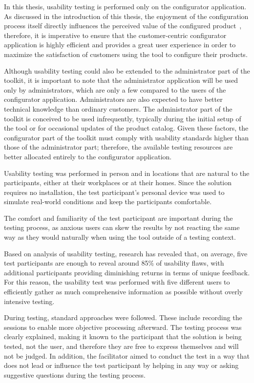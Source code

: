 In this thesis, usability testing is performed only on the configurator application. As discussed in the introduction of this thesis, the enjoyment of the configuration process itself directly influences the perceived value of the configured product~\cite{Franke2010}, therefore, it is imperative to ensure that the customer-centric configurator application is highly efficient and provides a great user experience in order to maximize the satisfaction of customers using the tool to configure their products.

Although usability testing could also be extended to the administrator part of the toolkit, it is important to note that the administrator application will be used only by administrators, which are only a few compared to the users of the configurator application. Administrators are also expected to have better technical knowledge than ordinary customers. The administrator part of the toolkit is conceived to be used infrequently, typically during the initial setup of the tool or for occasional updates of the product catalog. Given these factors, the configurator part of the toolkit must comply with usability standards higher than those of the administrator part; therefore, the available testing resources are better allocated entirely to the configurator application.

Usability testing was performed in person and in locations that are natural to the participants, either at their workplaces or at their homes. Since the solution requires no installation, the test participant's personal device was used to simulate real-world conditions and keep the participants comfortable.

The comfort and familiarity of the test participant are important during the testing process, as anxious users can skew the results by not reacting the same way as they would naturally when using the tool outside of a testing context.~\cite{Nielsen1994}

Based on analysis of usability testing, research has revealed that, on average, five test participants are enough to reveal around 85\% of usability flaws, with additional participants providing diminishing returns in terms of unique feedback. \cite{Nielsen2000} For this reason, the usability test was performed with five different users to efficiently gather as much comprehensive information as possible without overly intensive testing.  

During testing, standard approaches were followed. These include recording the sessions to enable more objective processing afterward. The testing process was clearly explained, making it known to the participant that the solution is being tested, not the user, and therefore they are free to express themselves and will not be judged. In addition, the facilitator aimed to conduct the test in a way that does not lead or influence the test participant by helping in any way or asking suggestive questions during the testing process.~\cite{Moran2019}


